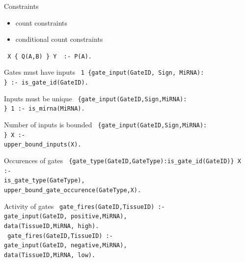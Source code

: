 \documentclass[10pt,dvipsnames]{beamer}
\begin{document}
\begin{frame}[fragile]{Constraints}
 \begin{itemize}
  \item count constraints
  \item conditional count constraints
 \end{itemize}
 \vspace{1cm}
 \begin{center}
  \texttt{ X \{ Q(A,B) \} Y {\color{orange} :- P(A)}. }
 \end{center}


\end{frame}


\begin{frame}{Gates must have inputs}
 \texttt{
 1 \{gate\_input(GateID, Sign, MiRNA):\\
  \} :- is\_gate\_id(GateID).
 }
\end{frame}


\begin{frame}{Inputs must be unique}
 \texttt{
  \{gate\_input(GateID,Sign,MiRNA):\\
   \} 1 :- is\_mirna(MiRNA).
 }
\end{frame}


\begin{frame}{Number of inputs is bounded}
 \texttt{
  \{gate\_input(GateID,Sign,MiRNA):\\
   \} X :-\\
   \quad upper\_bound\_inputs(X).
 }
\end{frame}

\begin{frame}{Occurences of gates}
 \texttt{
  \{gate\_type(GateID,GateType):{\color{gray}\;is\_gate\_id(GateID)}\} X :-\\
     \quad is\_gate\_type(GateType),\\
     \quad upper\_bound\_gate\_occurence(GateType,X).
 }
\end{frame}
 

\begin{frame}{Activity of gates}
 \texttt{
 gate\_fires(GateID,TissueID) :-\\
   \quad gate\_input(GateID,{\color{orange} positive},MiRNA),\\
   \quad data(TissueID,MiRNA,{\color{orange} high}).\\
 }
 \vspace{1cm}
 \texttt{
 gate\_fires(GateID,TissueID) :-\\
   \quad gate\_input(GateID,{\color{orange} negative},MiRNA),\\
   \quad data(TissueID,MiRNA,{\color{orange} low}).
 }
\end{frame}
\end{document}
